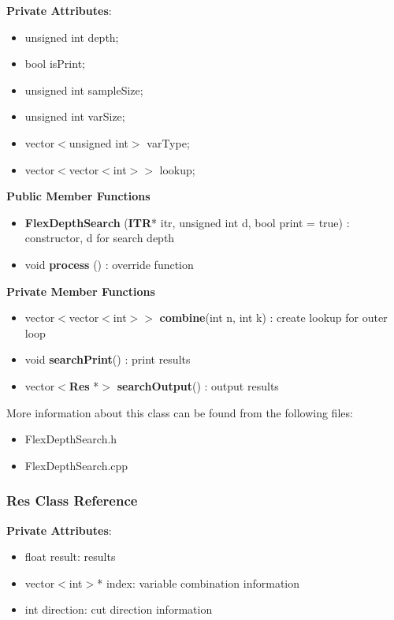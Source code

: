 \documentclass{article}
\begin{document}
\textbf{Private Attributes}:
\begin{itemize}
\item unsigned int depth;                
\item bool isPrint;                      
\item unsigned int sampleSize;           
\item unsigned int varSize;              
\item vector$<$unsigned int$>$ varType;
\item vector$<$vector$<$int$>>$ lookup;    
\end{itemize}

\textbf{Public Member Functions}
\begin{itemize}
\item \textbf{FlexDepthSearch} (\textbf{ITR}* itr, unsigned int d, bool print = true) : constructor, d for search depth
\item void \textbf{process} () :  override function
\end{itemize}

\textbf{Private Member Functions}
\begin{itemize}    
\item vector$<$vector$<$int$>>$ \textbf{combine}(int n, int k) : create lookup for outer loop
\item void \textbf{searchPrint}() : print results
\item vector$<$\textbf{Res} *$>$ \textbf{searchOutput}() : output results
\end{itemize}


More information about this class can be found from the following files:
\begin{itemize}
\item FlexDepthSearch.h
\item FlexDepthSearch.cpp
\end{itemize}


\subsubsection{Res Class Reference}
\textbf{Private Attributes}:
\begin{itemize}
\item float result: results
\item vector$<$int$>$* index: variable combination information
\item int direction: cut direction information
\end{itemize}
\end{document}

